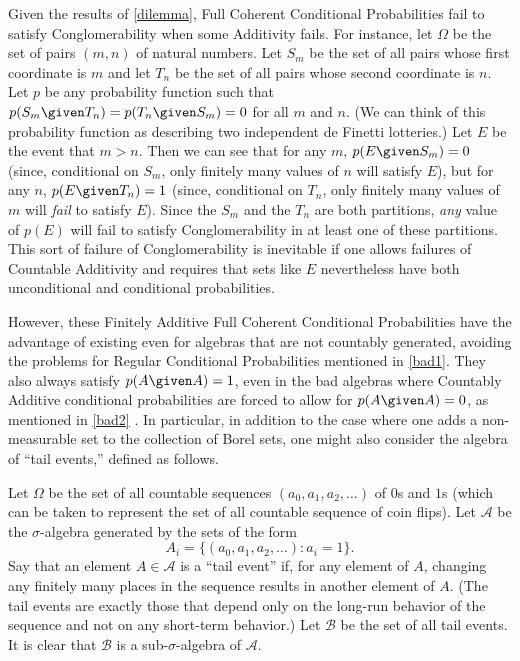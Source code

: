 Given the results of \autoref{dilemma}, Full Coherent Conditional Probabilities fail to satisfy Conglomerability when some Additivity fails. For instance, let $\Omega$ be the set of pairs $(m,n)$ of natural numbers. Let $S_m$ be the set of all pairs whose first coordinate is $m$ and let $T_n$ be the set of all pairs whose second coordinate is $n$. Let $p$ be any probability function such that $p(S_m \given T_n)=p(T_n \given S_m)=0$ for all $m$ and $n$. (We can think of this probability function as describing two independent de Finetti lotteries.) Let $E$ be the event that $m>n$. Then we can see that for any $m$, $p(E \given S_m)=0$ (since, conditional on $S_m$, only finitely many values of $n$ will satisfy $E$), but for any $n$, $p(E \given T_n)=1$ (since, conditional on $T_n$, only finitely many values of $m$ will \emph{fail} to satisfy $E$). Since the $S_m$ and the $T_n$ are both partitions, \emph{any} value of $p(E)$ will fail to satisfy Conglomerability in at least one of these partitions. This sort of failure of Conglomerability is inevitable if one allows failures of Countable Additivity and requires that sets like $E$ nevertheless have both unconditional and conditional probabilities.

However, these Finitely Additive Full Coherent Conditional Probabilities have the advantage of existing even for algebras that are not countably generated, avoiding the problems for Regular Conditional Probabilities mentioned in \autoref{bad1}. They also always satisfy $p(A \given A)=1$, even in the bad algebras where Countably Additive conditional probabilities are forced to allow for $p(A \given A)=0$, as mentioned in \autoref{bad2} \citep{improper}. In particular, in addition to the case where one adds a non-measurable set to the collection of Borel sets, one might also consider the algebra of ``tail events,'' defined as follows.

Let $\Omega$ be the set of all countable sequences $(a_0,a_1,a_2,\dots)$ of $0$s and $1$s (which can be taken to represent the set of all countable sequence of coin flips). Let $\mathcal{A}$ be the $\sigma$-algebra generated by the sets of the form
$$A_i=\{(a_0,a_1,a_2,\dots)\colon a_i=1\}.$$
Say that an element $A\in\mathcal{A}$ is a ``tail event'' if, for any element of $A$, changing any finitely many places in the sequence results in another element of $A$. (The tail events are exactly those that depend only on the long-run behavior of the sequence and not on any short-term behavior.) Let $\mathcal{B}$ be the set of all tail events. It is clear that $\mathcal{B}$ is a sub-$\sigma$-algebra of $\mathcal{A}$.

